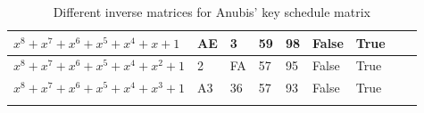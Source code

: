 \begin{footnotesize}
\begin{longtable}{|l|l|l|l|l|l|l|l|l|}
$x^8 + x^7 + x^6 + x^5 + x^4 + x + 1$   & AE            & 3                 & 59                  & 98                    & False               & True              &              &                                    \\ \hline
$x^8 + x^7 + x^6 + x^5 + x^4 + x^2 + 1$ & 2             & FA                & 57                  & 95                    & False               & True              &              &                                    \\ \hline
$x^8 + x^7 + x^6 + x^5 + x^4 + x^3 + 1$ & A3            & 36                & 57                  & 93                    & False               & True              &              &                                    \\ \hline
\caption{Different inverse matrices for Anubis' key schedule matrix}
\label{tab:poly-anubis-ke}\\
\end{longtable}
\end{footnotesize}


